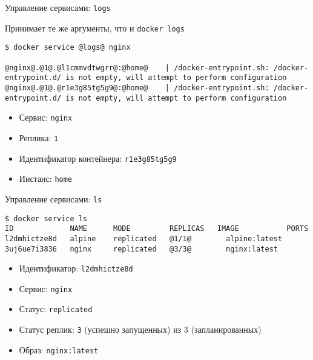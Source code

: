 \begin{frame}[fragile]{Управление сервисами: \texttt{logs} }

Принимает те же аргументы, что и \texttt{docker logs}

\begin{tcolorbox-code}
\begin{lstlisting}[style=base]
$ docker service @logs@ nginx

@nginx@.@1@.@l1cmmvdtwgrr@:@home@    | /docker-entrypoint.sh: /docker-entrypoint.d/ is not empty, will attempt to perform configuration
@nginx@.@1@.@r1e3g85tg5g9@:@home@    | /docker-entrypoint.sh: /docker-entrypoint.d/ is not empty, will attempt to perform configuration
\end{lstlisting}
\end{tcolorbox-code}

\begin{itemize}
    \item Сервис: \texttt{nginx}
    \item Реплика: \texttt{1}
    \item Идентификатор контейнера: \texttt{r1e3g85tg5g9}
    \item Инстанс: \texttt{home}
\end{itemize}

\end{frame}

\begin{frame}[fragile]{Управление сервисами: \texttt{ls} }

\begin{tcolorbox-code}
\begin{lstlisting}[style=base]
$ docker service ls
ID             NAME      MODE         REPLICAS   IMAGE           PORTS
l2dmhictze8d   alpine    replicated   @1/1@        alpine:latest   
3uj6ue7i3836   nginx     replicated   @3/3@        nginx:latest
\end{lstlisting}
\end{tcolorbox-code}

\begin{itemize}
    \item Идентификатор: \texttt{l2dmhictze8d}
    \item Сервис: \texttt{nginx}
    \item Статус: \texttt{replicated}
    \item Статус реплик: \texttt{3} (успешно запущенных) из 3 (запланированных)
    \item Образ: \texttt{nginx:latest}
\end{itemize}

\end{frame}

